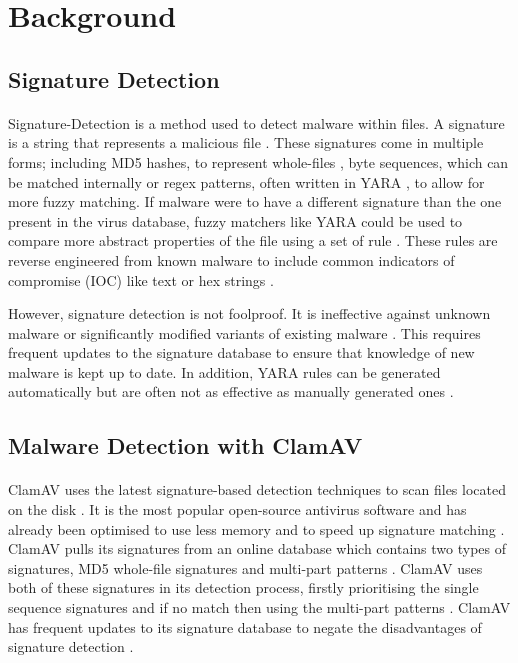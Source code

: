 \documentclass[12pt, conference, final, a4paper, onecolumn, compsoc]{IEEEtran}
\begin{document}
\section{Background}

\subsection{Signature Detection} %
\paragraph{}

Signature-Detection is a method used to detect malware within files. A signature
is a string that represents a malicious file \citep{intrusion-detect}. These
signatures come in multiple forms; including MD5 hashes, to represent whole-files
\citep{sig-detection}, byte sequences, which can be matched internally or regex
patterns, often written in YARA \citep{yara}, to allow for more fuzzy matching.
If malware were to have a different signature than the one present in the virus
database, fuzzy matchers like YARA could be used to compare more abstract
properties of the file using a set of rule \citep{yara}. These rules are reverse
engineered from known malware to include common indicators of compromise (IOC)
like text or hex strings \citep{yara-rules}.

However, signature detection is not foolproof. It is ineffective against unknown
malware or significantly modified variants of existing malware
\citep{intrusion-detect}. This requires frequent updates to the signature
database to ensure that knowledge of new malware is kept up to date. In
addition, YARA rules can be generated automatically but are often not as
effective as manually generated ones \citep{yara}.

\subsection{Malware Detection with ClamAV}
\paragraph{}

ClamAV uses the latest signature-based detection techniques to scan files
located on the disk \citep{splitscreen}. It is the most popular open-source
antivirus software and has already been optimised to use less memory and to
speed up signature matching \citep{splitscreen}. ClamAV pulls its signatures
from an online database which contains two types of signatures, MD5 whole-file
signatures and multi-part patterns \citep{string-matching}. ClamAV uses both of
these signatures in its detection process, firstly prioritising the single
sequence signatures and if no match then using the multi-part patterns
\citep{string-matching}. ClamAV has frequent updates to its signature database
to negate the disadvantages of signature detection \citep{clamav}.
\end{document}
